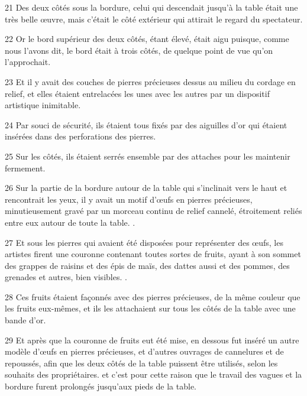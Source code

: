 \par 21 Des deux côtés sous la bordure, celui qui descendait jusqu'à la table était une très belle œuvre, mais c'était le côté extérieur qui attirait le regard du spectateur.

\par 22 Or le bord supérieur des deux côtés, étant élevé, était aigu puisque, comme nous l'avons dit, le bord était à trois côtés, de quelque point de vue qu'on l'approchait.

\par 23 Et il y avait des couches de pierres précieuses dessus au milieu du cordage en relief, et elles étaient entrelacées les unes avec les autres par un dispositif artistique inimitable.

\par 24 Par souci de sécurité, ils étaient tous fixés par des aiguilles d'or qui étaient insérées dans des perforations des pierres.

\par 25 Sur les côtés, ils étaient serrés ensemble par des attaches pour les maintenir fermement.

\par 26 Sur la partie de la bordure autour de la table qui s'inclinait vers le haut et rencontrait les yeux, il y avait un motif d'œufs en pierres précieuses, minutieusement gravé par un morceau continu de relief cannelé, étroitement reliés entre eux autour de toute la table. .

\par 27 Et sous les pierres qui avaient été disposées pour représenter des œufs, les artistes firent une couronne contenant toutes sortes de fruits, ayant à son sommet des grappes de raisins et des épis de maïs, des dattes aussi et des pommes, des grenades et autres, bien visibles. .

\par 28 Ces fruits étaient façonnés avec des pierres précieuses, de la même couleur que les fruits eux-mêmes, et ils les attachaient sur tous les côtés de la table avec une bande d'or.

\par 29 Et après que la couronne de fruits eut été mise, en dessous fut inséré un autre modèle d'œufs en pierres précieuses, et d'autres ouvrages de cannelures et de repoussés, afin que les deux côtés de la table puissent être utilisés, selon les souhaits des propriétaires. et c'est pour cette raison que le travail des vagues et la bordure furent prolongés jusqu'aux pieds de la table.

